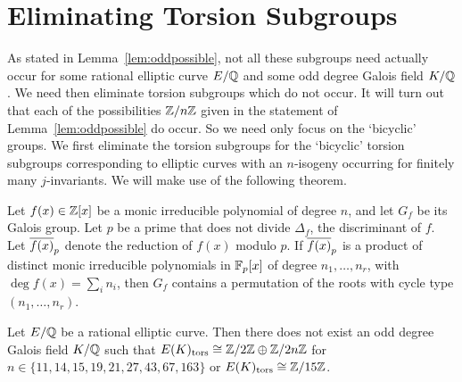 \section{Eliminating Torsion Subgroups}

As stated in Lemma~\ref{lem:oddpossible}, not all these subgroups need actually occur for some rational elliptic curve $E/\mathbb{Q}$ and some odd degree Galois field $K/\mathbb{Q}$. We need then eliminate torsion subgroups which do not occur. It will turn out that each of the possibilities $\mathbb{Z}/n\mathbb{Z}$ given in the statement of Lemma~\ref{lem:oddpossible} do occur. So we need only focus on the `bicyclic' groups. We first eliminate the torsion subgroups for the `bicyclic' torsion subgroups corresponding to elliptic curves with an $n$-isogeny occurring for finitely many $j$-invariants. We will make use of the following theorem.


\begin{thm} \label{thm:dedekind}
Let $f(x) \in \mathbb{Z}[x]$ be a monic irreducible polynomial of degree $n$, and let $G_f$ be its Galois group. Let $p$ be a prime that does not divide $\Delta_f$, the discriminant of $f$. Let $\overline{f(x)}_p$ denote the reduction of $f(x)$ modulo $p$. If $\overline{f(x)}_p$ is a product of distinct monic irreducible polynomials in $\mathbb{F}_p[x]$ of degree $n_1, \ldots, n_r$, with $\deg f(x)= \sum_i n_i$, then $G_f$ contains a permutation of the roots with cycle type $(n_1, \ldots, n_r)$. 
\end{thm}


\begin{lem} \label{lem:oddbicyclicelim}
Let $E/\mathbb{Q}$ be a rational elliptic curve. Then there does not exist an odd degree Galois field $K/\mathbb{Q}$ such that $E(K)_{\text{tors}} \cong \mathbb{Z}/2\mathbb{Z} \oplus \mathbb{Z}/2n\mathbb{Z}$ for $n \in \{ 11, 14, 15, 19, 21, 27, 43, 67, 163 \}$ or $E(K)_{\text{tors}} \cong \mathbb{Z}/15\mathbb{Z}$. 
\end{lem}

